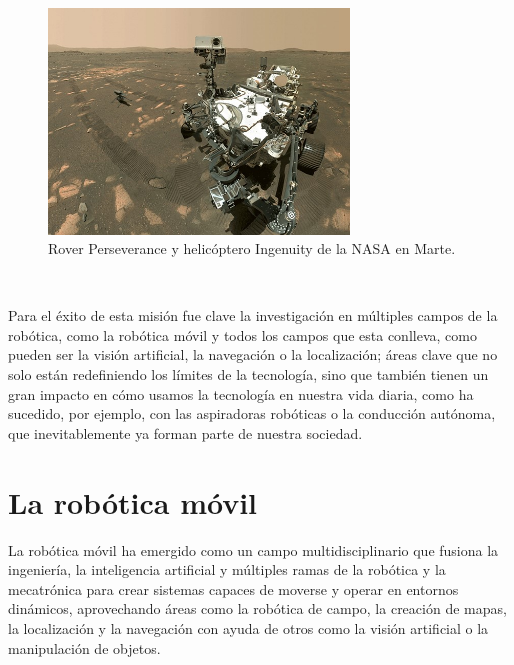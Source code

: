 \begin{figure} [h!]
  \begin{center}
    \includegraphics[width=8cm]{figs/perseverance_and_ingenuity_mars_rover_selfie}
  \end{center}
  \caption{Rover Perseverance y helicóptero Ingenuity de la NASA en Marte.}
  \label{fig:rover}
\end{figure}\


Para el éxito de esta misión fue clave la investigación en múltiples campos de
la robótica, como la robótica móvil y todos los campos que esta conlleva, como
pueden ser la visión artificial, la navegación o la localización; áreas clave
que no solo están redefiniendo los límites de la tecnología, sino que también
tienen un gran impacto en cómo usamos la tecnología en nuestra vida diaria, como
ha sucedido, por ejemplo, con las aspiradoras robóticas o la conducción
autónoma, que inevitablemente ya forman parte de nuestra sociedad.



\section{La robótica móvil}
\label{sec:robotica_movil} %

La robótica móvil ha emergido como un campo multidisciplinario que fusiona la
ingeniería, la inteligencia artificial y múltiples ramas de la robótica y la
mecatrónica para crear sistemas capaces de moverse y operar en entornos
dinámicos, aprovechando áreas como la robótica de campo, la creación de mapas,
la localización y la navegación con ayuda de otros como la visión artificial o
la manipulación de objetos.

